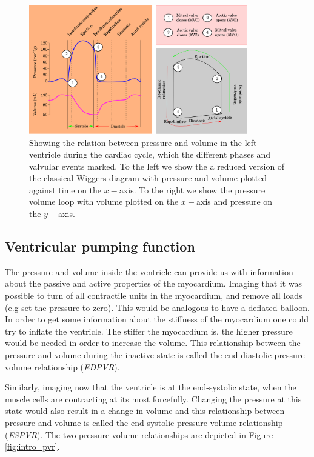 \begin{figure}[htbp]
  \centering
    \includegraphics[width=0.85\textwidth]{chapters/introduction/figures/cardiac_cycle.png}
\caption{Showing the relation between pressure and volume in the left
  ventricle during the cardiac cycle, which the different phases and
  valvular events marked. To the left we show the a reduced version of
the classical Wiggers diagram with pressure and volume plotted against
time on the $x-$axis. To the right we show the pressure volume loop
with volume plotted on the $x-$axis and pressure on the $y-$axis. }
\label{fig:pv_loop}
\end{figure}


\subsection{Ventricular pumping function}
\label{sec:ventricular_pumping_function}



The pressure and volume inside the ventricle can provide us with
information about the passive and active properties of the
myocardium. Imaging that it was possible to turn of all contractile
units in the myocardium, and remove all loads (e.g set the pressure
to zero). This would be analogous to have a deflated balloon. In order to
get some information about the stiffness of the myocardium one could
try to inflate the ventricle. The stiffer the myocardium is, the
higher pressure would be needed in order to increase the volume.
This relationship between the pressure and volume during the inactive
state is called the end diastolic pressure volume relationship
(\emph{EDPVR}).

Similarly, imaging now that the ventricle is at the end-systolic state,
when the muscle cells are contracting at its most forcefully. Changing
the pressure at this state would also result in a change in volume and
this relationship between pressure and volume  is called the end
systolic pressure volume relationship (\emph{ESPVR}). The two pressure
volume relationships are depicted in Figure \ref{fig:intro_pvr}.

